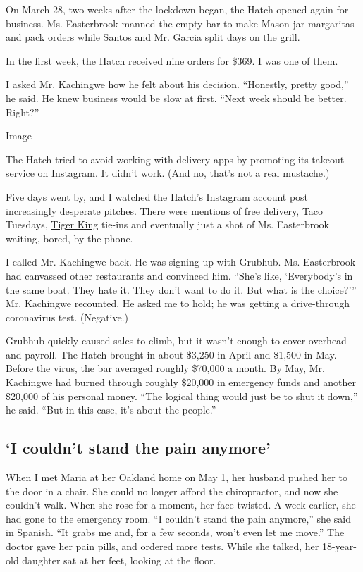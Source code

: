 On March 28, two weeks after the lockdown began, the Hatch opened again
for business. Ms. Easterbrook manned the empty bar to make Mason-jar
margaritas and pack orders while Santos and Mr. Garcia split days on the
grill.

In the first week, the Hatch received nine orders for \$369. I was one
of them.

I asked Mr. Kachingwe how he felt about his decision. ``Honestly, pretty
good,'' he said. He knew business would be slow at first. ``Next week
should be better. Right?''

Image

The Hatch tried to avoid working with delivery apps by promoting its
takeout service on Instagram. It didn't work. (And no, that's not a real
mustache.)

Five days went by, and I watched the Hatch's Instagram account post
increasingly desperate pitches. There were mentions of free delivery,
Taco Tuesdays,
\href{https://www.nytimes3xbfgragh.onion/2020/04/02/arts/television/tiger-king-style.html}{Tiger
King} tie-ins and eventually just a shot of Ms. Easterbrook waiting,
bored, by the phone.

I called Mr. Kachingwe back. He was signing up with Grubhub. Ms.
Easterbrook had canvassed other restaurants and convinced him. ``She's
like, `Everybody's in the same boat. They hate it. They don't want to do
it. But what is the choice?''' Mr. Kachingwe recounted. He asked me to
hold; he was getting a drive-through coronavirus test. (Negative.)

Grubhub quickly caused sales to climb, but it wasn't enough to cover
overhead and payroll. The Hatch brought in about \$3,250 in April and
\$1,500 in May. Before the virus, the bar averaged roughly \$70,000 a
month. By May, Mr. Kachingwe had burned through roughly \$20,000 in
emergency funds and another \$20,000 of his personal money. ``The
logical thing would just be to shut it down,'' he said. ``But in this
case, it's about the people.''

\hypertarget{i-couldnt-stand-the-pain-anymore}{%
\subsection{`I couldn't stand the pain
anymore'}\label{i-couldnt-stand-the-pain-anymore}}

When I met Maria at her Oakland home on May 1, her husband pushed her to
the door in a chair. She could no longer afford the chiropractor, and
now she couldn't walk. When she rose for a moment, her face twisted. A
week earlier, she had gone to the emergency room. ``I couldn't stand the
pain anymore,'' she said in Spanish. ``It grabs me and, for a few
seconds, won't even let me move.'' The doctor gave her pain pills, and
ordered more tests. While she talked, her 18-year-old daughter sat at
her feet, looking at the floor.

